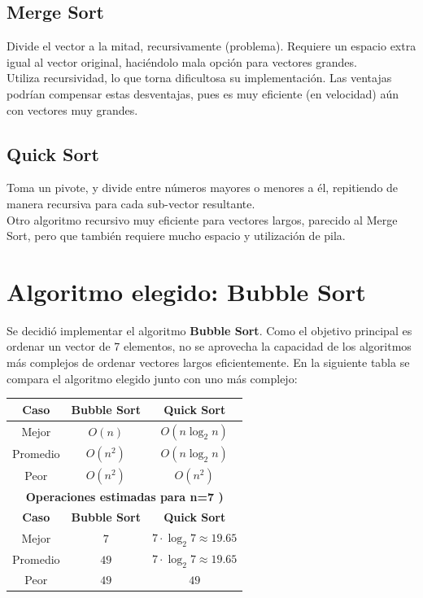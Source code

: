\documentclass{sciposter}
\begin{document}
\begin{multicols*}{2}
\subsection{Merge Sort}
Divide el vector a la mitad, recursivamente (problema).
Requiere un espacio extra igual al vector original, haciéndolo mala opción para vectores grandes.\\
Utiliza recursividad, lo que torna dificultosa su implementación.
Las ventajas podrían compensar estas desventajas, pues es muy eficiente (en velocidad) aún con vectores muy grandes.

\subsection{Quick Sort}
Toma un pivote, y divide entre números mayores o menores a él, repitiendo de manera recursiva para cada sub-vector resultante.\\
Otro algoritmo recursivo muy eficiente para vectores largos, parecido al Merge Sort, pero que también requiere mucho espacio y utilización de pila.\\

\section{Algoritmo elegido: Bubble Sort}
Se decidió implementar el algoritmo \textbf{Bubble Sort}.
Como el objetivo principal es ordenar un vector de 7 elementos, no se aprovecha la capacidad de los algoritmos más complejos de ordenar vectores largos eficientemente.
En la siguiente tabla se compara el algoritmo elegido junto con uno más complejo:

\begin{center}
\begin{tabular}{|c|c|c|}
\hline
\textbf{Caso} & \textbf{Bubble Sort} & \textbf{Quick Sort} \\
\hline
Mejor         & $O(n)$              & $O(n \log_2 n)$     \\
\hline
Promedio      & $O(n^2)$            & $O(n \log_2 n)$     \\
\hline
Peor          & $O(n^2)$            & $O(n^2)$            \\
\hline
\multicolumn{3}{|c|}{\textbf{Operaciones estimadas para n=7 )}} \\
\hline
\textbf{Caso} & \textbf{Bubble Sort} & \textbf{Quick Sort} \\
\hline
Mejor         & $7$                  & $7 \cdot \log_2 7 \approx 19.65$ \\
\hline
Promedio      & $49$                 & $7 \cdot \log_2 7 \approx 19.65$ \\
\hline
Peor          & $49$                 & $49$                 \\
\hline
\end{tabular}
\end{center} 


\end{multicols*}
\end{document}
